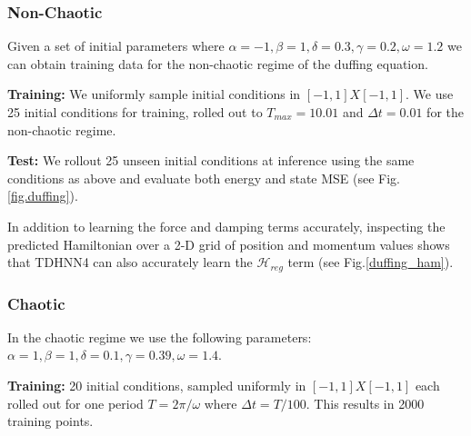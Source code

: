 \documentclass[twoside]{article}
\begin{document}
\subsubsection{Non-Chaotic}

Given a set of initial parameters where $\alpha =-1,\beta=1,\delta=0.3,\gamma=0.2,\omega=1.2$ we can obtain training data for the non-chaotic regime of the duffing equation. 

\textbf{Training:} We uniformly sample initial conditions in $[-1,1]X[-1,1]$. We use 25 initial conditions for training, rolled out to $T_{max}=10.01$ and $\Delta t =0.01$ for the non-chaotic regime. 

\textbf{Test:} We rollout 25 unseen initial conditions at inference using the same conditions as above and evaluate both energy and state MSE (see Fig.\ref{fig.duffing}).

In addition to learning the force and damping terms accurately, inspecting the predicted Hamiltonian over a 2-D grid of position and momentum values shows that TDHNN4 can also accurately learn the $\mathcal{H}_{reg}$ term (see Fig.\ref{duffing_ham}).

\subsubsection{Chaotic}

In the chaotic regime we use the following parameters:
$\alpha =1,\beta=1,\delta=0.1,\gamma=0.39,\omega=1.4$. 

\textbf{Training:} 20 initial conditions, sampled uniformly in $[-1,1]X[-1,1]$ each rolled out for one period $T=2\pi/\omega$ where $\Delta t = T/100$. This results in 2000 training points.
\end{document}
